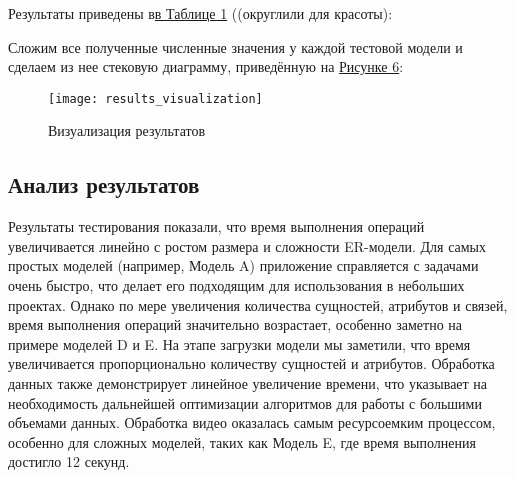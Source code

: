     Результаты приведены в\hyperref[tab:t1]{в Таблице 1} ((округлили для красоты):

    \begin{table}[ht]
        \caption{Результаты тестирования}
        \label{tab:t1}
        \centering
    \end{table}

    Сложим все полученные численные значения у каждой тестовой модели и сделаем из нее стековую диаграмму, приведённую на \hyperref[fig:results_visualization]{Рисунке 6}:

    \begin{figure}[ht]
        \centering
        \texttt{[image: results\_visualization]}
        \caption{Визуализация результатов}
        \label{fig:results_visualization}
    \end{figure}

    \subsection{Анализ результатов}
    Результаты тестирования показали, что время выполнения операций увеличивается линейно с ростом размера и сложности ER-модели. Для самых простых моделей (например, Модель A) приложение справляется с задачами очень быстро, что делает его подходящим для использования в небольших проектах. Однако по мере увеличения количества сущностей, атрибутов и связей, время выполнения операций значительно возрастает, особенно заметно на примере моделей D и E. На этапе загрузки модели мы заметили, что время увеличивается пропорционально количеству сущностей и атрибутов. Обработка данных также демонстрирует линейное увеличение времени, что указывает на необходимость дальнейшей оптимизации алгоритмов для работы с большими объемами данных. Обработка видео оказалась самым ресурсоемким процессом, особенно для сложных моделей, таких как Модель E, где время выполнения достигло 12 секунд.


